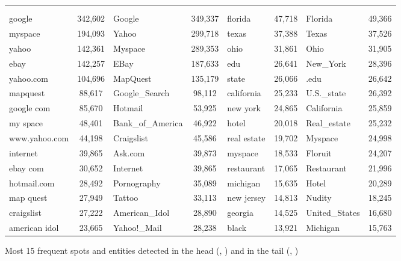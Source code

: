 \begin{figure}[t]
	\footnotesize
	\centering
\begin{tabular}{lc|lc|lc|lc}
\toprule
\multicolumn{4}{c}{\head{}} & \multicolumn{4}{c}{\tail{}}\\
\multicolumn{2}{c}{\shead{}} & \multicolumn{2}{c}{\ehead{}} & \multicolumn{2}{c}{\stail{}} & \multicolumn{2}{c}{\etail{}}\\
\midrule
google         & 342,602  &  Google  		   & 349,337  &  florida 	 &	47,718	&	Florida 		& 49,366 \\
myspace        & 194,093  &  Yahoo\!  		   & 299,718  &  texas  	 &	 37,388  &   Texas   		& 37,526 \\
yahoo          & 142,361  &  Myspace 		   & 289,353  &  ohio    	 &	31,861   &   Ohio    		& 31,905 \\			
ebay           & 142,257  &   EBay   		   & 187,633  &  edu     	 &	26,641   &   New\_York        & 28,396 \\
yahoo.com      & 104,696  &  MapQuest          & 135,179  &  state   	 &	26,066   &   .edu    		& 26,642 \\
mapquest       & 88,617   &  Google\_Search     & 98,112   &  california  &   25,233  &   U.S.\_state      & 26,392 \\
google com     & 85,670   &  Hotmail           & 53,925   &  new york    &   24,865  &   California      & 25,859 \\
my space       & 48,401   &	  Bank\_of\_America  & 46,922   &  hotel   	 &	20,018   &   Real\_estate     & 25,232 \\
www.yahoo.com  & 44,198   &  Craigslist        & 45,586   &  real estate &   19,702  &   Myspace 		& 24,998 \\
internet       & 39,865   &  Ask.com           & 39,873   &  myspace 	 &	18,533   &   Floruit 		& 24,207 \\
ebay com       & 30,652   &  Internet          & 39,865   &  restaurant  &  17,065   &   Restaurant      & 21,996 \\
hotmail.com    & 28,492   &  Pornography       & 35,089   &  michigan    &   15,635  &   Hotel   		& 20,289 \\
map quest      & 27,949   &  Tattoo            & 33,113   &  new jersey  &   14,813  &   Nudity  		& 18,245 \\
craigslist     & 27,222   &  American\_Idol     & 28,890   &  georgia 	 &	14,525   &   United\_States   & 16,680 \\
american idol  & 23,665   &  Yahoo!\_Mail       & 28,238   &  black   	 &	13,921   &   Michigan        & 15,763 \\
\bottomrule
\end{tabular}
\label{tab:top-frequent}
\caption{Most 15 frequent spots and entities detected in the head (\shead{}, \ehead{}) and in the tail (\stail{}, \etail{})}
\end{figure}


